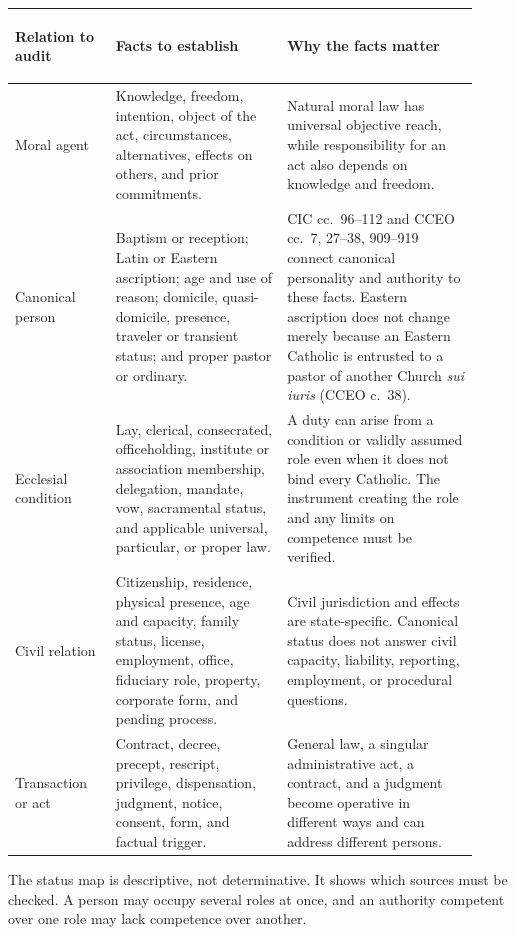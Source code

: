 \begin{longtable}{>{\bfseries\raggedright\arraybackslash}p{0.20\linewidth}>{\raggedright\arraybackslash}p{0.34\linewidth}>{\raggedright\arraybackslash}p{0.38\linewidth}}
\toprule
\textbf{Relation to audit} & \textbf{Facts to establish} & \textbf{Why the facts matter}\\
\midrule
\endhead
Moral agent & Knowledge, freedom, intention, object of the act, circumstances, alternatives, effects on others, and prior commitments. & Natural moral law has universal objective reach, while responsibility for an act also depends on knowledge and freedom.\\
Canonical person & Baptism or reception; Latin or Eastern ascription; age and use of reason; domicile, quasi-domicile, presence, traveler or transient status; and proper pastor or ordinary. & CIC cc.~96--112 and CCEO cc.~7, 27--38, 909--919 connect canonical personality and authority to these facts. Eastern ascription does not change merely because an Eastern Catholic is entrusted to a pastor of another Church \emph{sui iuris} (CCEO c.~38).\\
Ecclesial condition & Lay, clerical, consecrated, officeholding, institute or association membership, delegation, mandate, vow, sacramental status, and applicable universal, particular, or proper law. & A duty can arise from a condition or validly assumed role even when it does not bind every Catholic. The instrument creating the role and any limits on competence must be verified.\\
Civil relation & Citizenship, residence, physical presence, age and capacity, family status, license, employment, office, fiduciary role, property, corporate form, and pending process. & Civil jurisdiction and effects are state-specific. Canonical status does not answer civil capacity, liability, reporting, employment, or procedural questions.\\
Transaction or act & Contract, decree, precept, rescript, privilege, dispensation, judgment, notice, consent, form, and factual trigger. & General law, a singular administrative act, a contract, and a judgment become operative in different ways and can address different persons.\\
\bottomrule
\end{longtable}

The status map is descriptive, not determinative. It shows which sources must be checked. A person may occupy several roles at once, and an authority competent over one role may lack competence over another.

